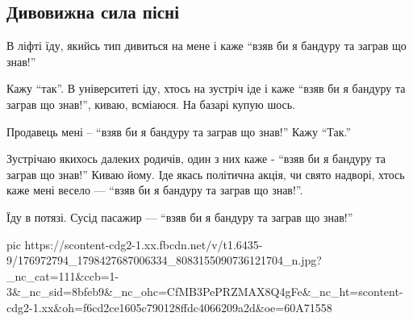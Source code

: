  
 
 
 
 

\subsection{Дивовижна сила пісні}
\label{sec:22_04_2021.fb.chornoshlychnyk.1.sila_pesni_bandura}

В  ліфті  їду, якийсь тип дивиться на мене і каже \enquote{взяв би я бандуру та заграв що знав!} 

Кажу \enquote{так}. В університеті іду, хтось на зустріч іде  і каже   
\enquote{взяв би я бандуру та заграв що знав!},   киваю, всміаюся. На базарі купую  шось.

Продавець  мені -- \enquote{взяв би я бандуру та заграв що знав!} Кажу \enquote{Так.}

Зустрічаю  якихось  далеких  родичів,  один з  них  каже - \enquote{взяв би я бандуру та заграв що знав!} 
Киваю йому. Іде якась  політична акція, чи свято надворі,
хтось  каже мені весело --- \enquote{взяв би я бандуру та заграв що знав!}.

Їду в потязі. Сусід  пасажир  --- \enquote{взяв би я бандуру та заграв що знав!}

\ifcmt
  pic https://scontent-cdg2-1.xx.fbcdn.net/v/t1.6435-9/176972794_1798427687006334_8083155090736121704_n.jpg?_nc_cat=111&ccb=1-3&_nc_sid=8bfeb9&_nc_ohc=CfMB3PePRZMAX8Q4gFe&_nc_ht=scontent-cdg2-1.xx&oh=f6cd2ce1605c790128ffdc4066209a2d&oe=60A71558
\fi

